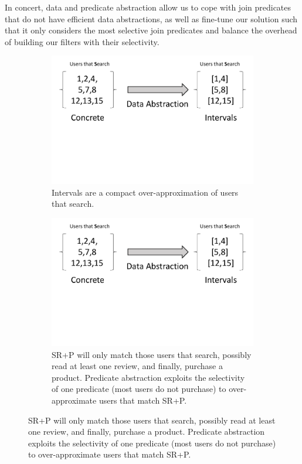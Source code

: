 In concert, data and predicate abstraction allow us to cope with join predicates
that do not have efficient data abstractions, as well as fine-tune our solution
such that it only considers the most selective join predicates and balance the
overhead of building our filters with their selectivity.
\begin{figure}
  \centering
  \begin{subfigure}{\columnwidth}
    \centering    
    \includegraphics[clip, page=1,width=\columnwidth]{graphs/motivation.pdf}
    \vspace{-3cm}
    \caption{Intervals are a compact over-approximation of users that search.}
    \label{fig:dabstraction}
  \end{subfigure}
  \begin{subfigure}{\columnwidth}
    \includegraphics[clip, page=2,width=\columnwidth]{graphs/motivation.pdf}
    \caption{SR+P will only match those users that search, possibly read at
      least one review, and finally, purchase a product.  Predicate abstraction
      exploits the selectivity of one predicate (most users do not purchase) to
      over-approximate users that match SR+P.}
    \label{fig:pabstraction}
  \end{subfigure}
\end{figure}
      
